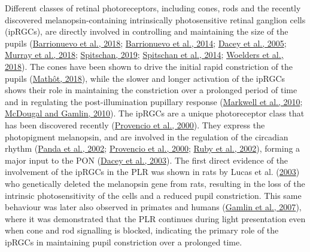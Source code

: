 \documentclass[
]{article}
\begin{document}
Different classes of retinal photoreceptors, including cones, rods and the recently discovered melanopsin-containing intrinsically photosensitive retinal ganglion cells (ipRGCs), are directly involved in controlling and maintaining the size of the pupils (\protect\hyperlink{ref-Barrionuevo2018}{Barrionuevo et al., 2018}; \protect\hyperlink{ref-Barrionuevo2014}{Barrionuevo et al., 2014}; \protect\hyperlink{ref-Dacey2005}{Dacey et al., 2005}; \protect\hyperlink{ref-Murray2018}{Murray et al., 2018}; \protect\hyperlink{ref-Spitschan2019}{Spitschan, 2019}; \protect\hyperlink{ref-Spitschan2014}{Spitschan et al., 2014}; \protect\hyperlink{ref-Woelders2018}{Woelders et al., 2018}). The cones have been shown to drive the initial rapid constriction of the pupils (\protect\hyperlink{ref-Mathot2018}{Mathôt, 2018}), while the slower and longer activation of the ipRGCs shows their role in maintaining the constriction over a prolonged period of time and in regulating the post-illumination pupillary response (\protect\hyperlink{ref-Markwell2010}{Markwell et al., 2010}; \protect\hyperlink{ref-McDougal2010}{McDougal and Gamlin, 2010}). The ipRGCs are a unique photoreceptor class that has been discovered recently (\protect\hyperlink{ref-Provencio2000}{Provencio et al., 2000}). They express the photopigment melanopsin, and are involved in the regulation of the circadian rhythm (\protect\hyperlink{ref-Panda2002}{Panda et al., 2002}; \protect\hyperlink{ref-Provencio2000}{Provencio et al., 2000}; \protect\hyperlink{ref-Ruby2002}{Ruby et al., 2002}), forming a major input to the PON (\protect\hyperlink{ref-Dacey2003}{Dacey et al., 2003}). The first direct evidence of the involvement of the ipRGCs in the PLR was shown in rats by Lucas et al. (\protect\hyperlink{ref-Lucas2003}{2003}) who genetically deleted the melanopsin gene from rats, resulting in the loss of the intrinsic photosensitivity of the cells and a reduced pupil constriction. This same behaviour was later also observed in primates and humans (\protect\hyperlink{ref-Gamlin2007}{Gamlin et al., 2007}), where it was demonstrated that the PLR continues during light presentation even when cone and rod signalling is blocked, indicating the primary role of the ipRGCs in maintaining pupil constriction over a prolonged time.
\end{document}
